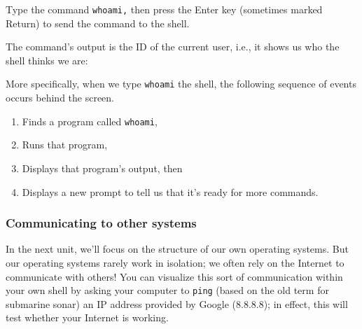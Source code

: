 \documentclass[
  letterpaper,
  DIV=11,
  numbers=noendperiod]{scrreprt}
\newenvironment{Shaded}{\begin{snugshade}}{\end{snugshade}}
\newcommand{\CommentTok}[1]{\textcolor[rgb]{0.37,0.37,0.37}{#1}}
\newcommand{\ExtensionTok}[1]{\textcolor[rgb]{0.00,0.23,0.31}{#1}}
\newcommand{\NormalTok}[1]{\textcolor[rgb]{0.00,0.23,0.31}{#1}}
\providecommand{\tightlist}{%
  \setlength{\itemsep}{0pt}\setlength{\parskip}{0pt}}\usepackage{longtable,booktabs,array}
\begin{document}
Type the command \texttt{whoami,} then press the Enter key (sometimes
marked Return) to send the command to the shell.

The command's output is the ID of the current user, i.e., it shows us
who the shell thinks we are:

\begin{Shaded}
\end{Shaded}

More specifically, when we type \texttt{whoami} the shell, the following
sequence of events occurs behind the screen.

\begin{enumerate}
\def\labelenumi{\arabic{enumi}.}
\tightlist
\item
  Finds a program called \texttt{whoami},
\item
  Runs that program,
\item
  Displays that program's output, then
\item
  Displays a new prompt to tell us that it's ready for more commands.
\end{enumerate}

\hypertarget{communicating-to-other-systems}{%
\subsubsection*{Communicating to other
systems}\label{communicating-to-other-systems}}

In the next unit, we'll focus on the structure of our own operating
systems. But our operating systems rarely work in isolation; we often
rely on the Internet to communicate with others! You can visualize this
sort of communication within your own shell by asking your computer to
\texttt{ping} (based on the old term for submarine sonar) an IP address
provided by Google (8.8.8.8); in effect, this will test whether your
Internet is working.

\begin{Shaded}
\end{Shaded}
\end{document}
